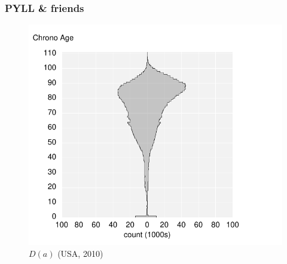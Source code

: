 \documentclass{beamer}
\begin{document}
\begin{frame}
\frametitle{PYLL \& friends}
\vspace{-1cm}
\begin{figure}[b]
    \centering
    \includegraphics[scale=.7]{Figures/f3_Da.pdf}
    \caption{$D(a)$ (USA, 2010)}
\end{figure} 
\end{frame}
\end{document}
